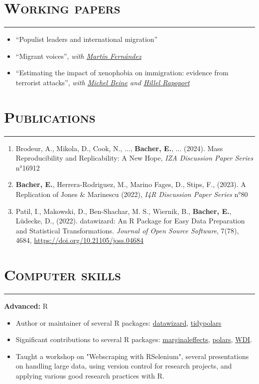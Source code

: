 \documentclass{article}
\newcommand{\sectionline}{%
  \vspace{-0.6cm}%
  \par\noindent\rule{\textwidth}{0.4pt}%
  \vspace{0.3cm}%
}
\let\xsection=\section
\renewcommand{\section}[1]{%
  \vspace{0.1cm}%
  \xsection*{\scshape{#1}}%
  \sectionline%
}
\def\tightlist{}
\begin{document}
\section{Working papers}

\begin{itemize}
\tightlist
\item
  ``Populist leaders and international migration''
\item
  ``Migrant voices'', \emph{with
  \href{https://sites.google.com/view/martinfernandezsanchez/}{Martín
  Fernández}}
\item
  ``Estimating the impact of xenophobia on immigration: evidence from terrorist attacks'', \emph{with
  \href{https://sites.google.com/site/michelbeineeconomics/home}{Michel
  Beine} and
  \href{https://www.parisschoolofeconomics.eu/en/rapoport-hillel/}{Hillel
  Rapoport}}
\end{itemize}

\section{Publications}

\begin{enumerate}
\def\labelenumi{\arabic{enumi}.}
\item
Brodeur, A., Mikola, D., Cook, N., ..., \textbf{Bacher, E.}, ... (2024). Mass Reproducibility and Replicability: A New Hope, \emph{IZA Discussion Paper Series} n°16912
\item
  \textbf{Bacher, E.}, Herrera-Rodriguez, M., Marino Fages, D., Stips,
  F., (2023). A Replication of Jones \& Marinescu (2022), \emph{I4R
  Discussion Paper Series} n°80
\item
  Patil, I., Makowski, D., Ben-Shachar, M. S., Wiernik, B.,
  \textbf{Bacher, E.}, Lüdecke, D., (2022). datawizard: An R Package for
  Easy Data Preparation and Statistical Transformations. \emph{Journal
  of Open Source Software}, 7(78), 4684,
  \url{https://doi.org/10.21105/joss.04684}
\end{enumerate}

\hypertarget{computer-skills}{%
\section{Computer skills}\label{computer-skills}}

\textbf{Advanced:} R

\begin{itemize}
\item
Author or maintainer of several R packages:
\href{https://easystats.github.io/datawizard/}{datawizard},
\href{https://tidypolars.etiennebacher.com/}{tidypolars}
\item
Significant contributions to several R packages:
\href{https://vincentarelbundock.github.io/marginaleffects/}{marginaleffects},
\href{https://rpolars.github.io/}{polars},
\href{https://vincentarelbundock.github.io/WDI/}{WDI}.
\item Taught a workshop on "Webscraping with RSelenium", several presentations on handling large data, using version control for research projects, and applying various good research practices with R.
\end{itemize}
\end{document}
